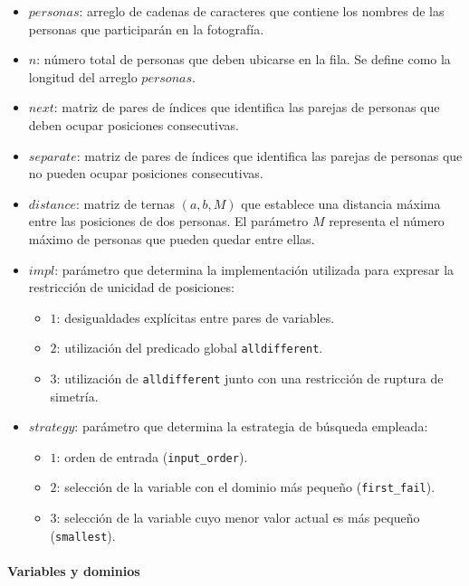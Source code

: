 \begin{itemize}
    \item $personas$: arreglo de cadenas de caracteres que contiene los nombres de las personas que participarán en la fotografía.

    \item $n$: número total de personas que deben ubicarse en la fila. Se define como la longitud del arreglo $personas$.

    \item $next$: matriz de pares de índices que identifica las parejas de personas que deben ocupar posiciones consecutivas.

    \item $separate$: matriz de pares de índices que identifica las parejas de personas que no pueden ocupar posiciones consecutivas.

    \item $distance$: matriz de ternas $(a,b,M)$ que establece una distancia máxima entre las posiciones de dos personas. El parámetro $M$ representa el número máximo de personas que pueden quedar entre ellas.

    \item $impl$: parámetro que determina la implementación utilizada para expresar la restricción de unicidad de posiciones:
    \begin{itemize}
        \item $1$: desigualdades explícitas entre pares de variables.
        \item $2$: utilización del predicado global \texttt{alldifferent}.
        \item $3$: utilización de \texttt{alldifferent} junto con una restricción de ruptura de simetría.
    \end{itemize}

    \item $strategy$: parámetro que determina la estrategia de búsqueda empleada:
    \begin{itemize}
        \item $1$: orden de entrada (\texttt{input\_order}).
        \item $2$: selección de la variable con el dominio más pequeño (\texttt{first\_fail}).
        \item $3$: selección de la variable cuyo menor valor actual es más pequeño (\texttt{smallest}).
    \end{itemize}
\end{itemize}

\paragraph{Variables y dominios}

